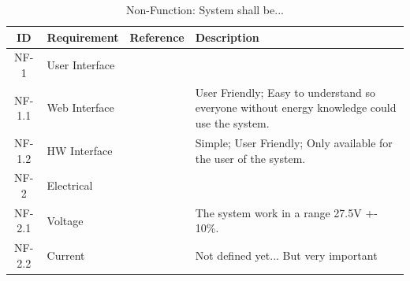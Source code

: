 		\begin{table}[h!]
			\begin{tabular} [b] {| c |  p{3cm} | c | p{10cm} |}
			\hline
			\textbf{ID} & \textbf{Requirement} & \textbf{Reference} & \textbf{Description} \\\hline
			NF-1 & User Interface &  &  \\ \hline
			NF-1.1 & Web Interface &  & User Friendly; Easy to understand so everyone without energy knowledge could use the system. \\ \hline
			NF-1.2 & HW Interface &  & Simple; User Friendly; Only available for the user of the system. \\ \hline
			NF-2 & Electrical &  &  \\ \hline
			NF-2.1 & Voltage &  & The system work in a range 27.5V +-  10\%.\\ \hline
			NF-2.2 & Current &  & Not defined yet... But very important \\ \hline
		\end{tabular}
		\caption{Non-Function: System shall be...}
		\end{table}
		\newpage
